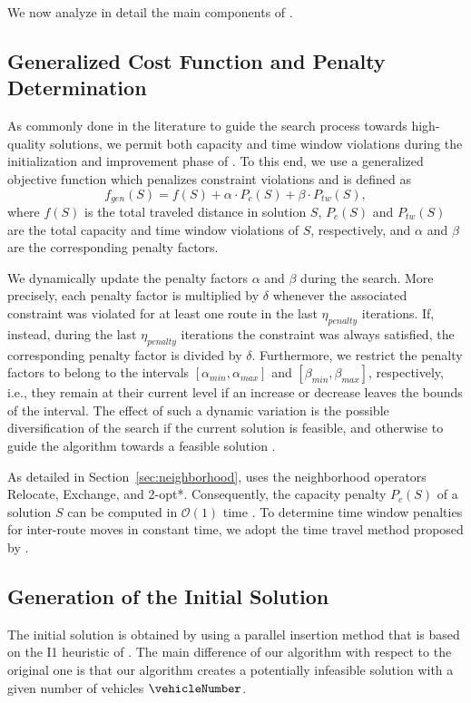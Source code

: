 \documentclass[11pt,a4paper,fleqn]{article}
\begin{document}
We now analyze in detail the main components of {\tsnew}.
 
\subsection{Generalized Cost Function and Penalty Determination}
\label{sec:costFunction}
As commonly done in the literature to guide the search process towards high-quality solutions, we permit both capacity and time window violations during the initialization and improvement phase of \tsnew. To this end, we use a generalized objective function \citep[see, e.g.,][]{cordeau:01} which penalizes constraint violations and is defined as
 $$f_{\mathit{gen}}(S) = f(S) + \alpha \cdot P_{c}(S) + \beta \cdot P_{\mathit{tw}}(S),$$
where $f(S)$ is the total traveled distance in solution $S$,  $P_c(S)$ and $P_{\mathit{tw}}(S)$ are the total capacity and time window violations of $S$, respectively, and  $\alpha$ and $\beta$ are the corresponding  penalty factors. 

We dynamically update the penalty factors $\alpha$ and $\beta$ during the search. More precisely, each penalty factor is multiplied by $\delta$ whenever the associated constraint was violated for at least one route in the last  $\eta_{\mathit{penalty}}$ iterations. If, instead, during the last  $\eta_{\mathit{penalty}}$ iterations the constraint was always satisfied, the corresponding penalty factor is divided by $\delta$. Furthermore, we restrict the penalty factors to belong to the intervals $[\alpha_{\mathit{min}},\alpha_{\mathit{max}}]$ and $[\beta_{\mathit{min}},\beta_{\mathit{max}}]$, respectively, i.e., they remain at their current level if an increase or decrease leaves the bounds of the interval. 
The effect of such a dynamic variation is the possible  diversification of the search if the current solution is feasible, and otherwise to guide the algorithm towards a feasible solution \citep[see, e.g.,][]{gendreau:94}. 

As detailed in Section~\ref{sec:neighborhood}, \tsnew uses the neighborhood operators Relocate, Exchange, and \mbox{2-opt*}.
Consequently, the capacity penalty $P_c(S)$ of a solution $S$ can be computed in $\mathcal{O}(1)$ time \citep[see, e.g.][]{kindervater:97}. To determine time window penalties for inter-route moves in constant time, we adopt the time travel method proposed by \citet{nagata:10} \citep[see also][]{schneider:13}. 

\subsection{Generation of the Initial Solution}
\label{sec:initialization}
The initial solution is obtained by using a parallel insertion method that is based on the I1 heuristic of \citet{solomon:87}. The main difference of our algorithm with respect to the original one is that our algorithm creates a potentially infeasible solution with a given number of vehicles $\vehicleNumber$. 
\end{document}
